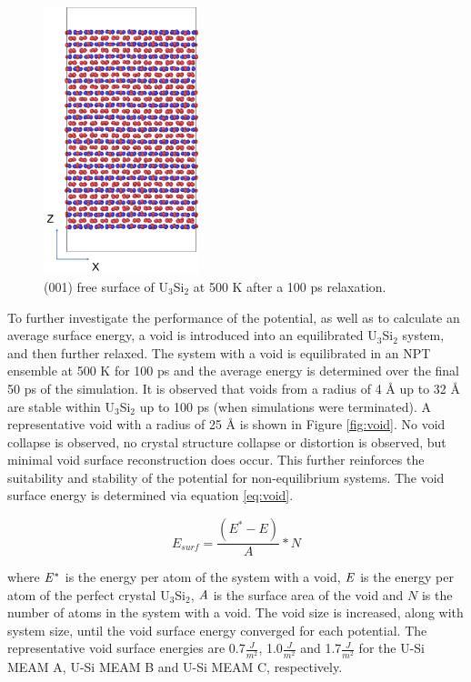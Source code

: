 \documentclass[review]{elsarticle}
\begin{document}
\begin{figure}[bt]
	\centering
	\includegraphics[width=0.4\textwidth]{001surfaceB.png}
    \caption{(001) free surface of U$_{3}$Si$_{2}$ at 500 K after a 100 ps relaxation. }\label{fig:ben8}
\end{figure}

To further investigate the performance of the potential, as well as to calculate an average surface energy, a void is introduced into an equilibrated U$_{3}$Si$_{2}$ system, and then further relaxed.  The system with a void is equilibrated in an NPT ensemble at 500 K for 100 ps and the average energy is determined over the final 50 ps of the simulation.  It is observed that voids from a radius of 4 {\AA} up to 32 {\AA} are stable within U$_{3}$Si$_{2}$ up to 100 ps (when simulations were terminated).   A representative void with a radius of 25 {\AA} is shown in Figure \ref{fig:void}.  No void collapse is observed, no crystal structure collapse or distortion is observed, but minimal void surface reconstruction does occur.  This further reinforces the suitability and stability of the potential for non-equilibrium systems.  The void surface energy is determined via equation \ref{eq:void}.

\begin{equation}
\label{eq:void}
E_{surf}= \frac{(E^{*} - E)}{A} * N
\end{equation}

where $\it{E^{*}}$ is the energy per atom of the system with a void, $\it{E}$ is the energy per atom of the perfect crystal U$_{3}$Si$_{2}$, $\it{A}$ is the surface area of the void and $\textit{N}$ is the number of atoms in the system with a void.  The void size is increased, along with system size, until the void surface energy converged for each potential.  The representative void surface energies are 0.7$\frac{J}{m^{2}}$, 1.0$\frac{J}{m^{2}}$ and 1.7$\frac{J}{m^{2}}$ for the U-Si MEAM A, U-Si MEAM B and U-Si MEAM C, respectively.
\end{document}
